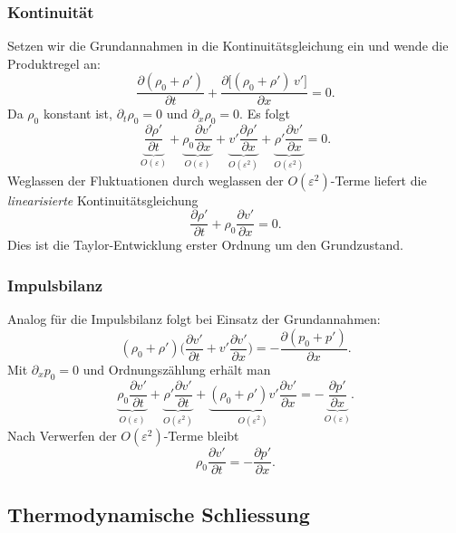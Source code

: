 \subsubsection{Kontinuität}
Setzen wir die Grundannahmen in die Kontinuitätsgleichung ein und
%
wende die Produktregel an:
\[
    \frac{\partial(\rho_0+\rho')}{\partial t}
    +\frac{\partial\big[(\rho_0+\rho')\,v'\big]}{\partial x}=0.
\]
Da \(\rho_0\) konstant ist, \(\partial_t\rho_0=0\) und \(\partial_x\rho_0=0\).
Es folgt
\[
    \underbrace{\frac{\partial \rho'}{\partial t}}_{\displaystyle O(\varepsilon)}
    +\underbrace{\rho_0\frac{\partial v'}{\partial x}}_{\displaystyle O(\varepsilon)}
    +\underbrace{v'\frac{\partial \rho'}{\partial x}}_{\displaystyle O(\varepsilon^2)}
    +\underbrace{\rho'\frac{\partial v'}{\partial x}}_{\displaystyle O(\varepsilon^2)}=0.
\]
Weglassen der Fluktuationen durch weglassen der \(O(\varepsilon^2)\)-Terme
liefert die \emph{linearisierte} Kontinuitätsgleichung
%
\begin{equation}
    \frac{\partial \rho'}{\partial t}+\rho_0\frac{\partial v'}{\partial x}=0.
    \label{eq:lin-cont}
\end{equation}
Dies ist die Taylor-Entwicklung erster Ordnung um den Grundzustand.

\subsubsection{Impulsbilanz}
Analog für die Impulsbilanz folgt bei Einsatz der Grundannahmen:
\[
    (\rho_0+\rho')\biggl(\frac{\partial v'}{\partial t}+v'\frac{\partial v'}{\partial x}\biggr)
    =-\frac{\partial (p_0+p')}{\partial x}.
\]
Mit \(\partial_x p_0=0\) und Ordnungszählung erhält man
\[
    \underbrace{\rho_0\frac{\partial v'}{\partial t}}_{\displaystyle O(\varepsilon)}
    +\underbrace{\rho'\frac{\partial v'}{\partial t}}_{\displaystyle O(\varepsilon^2)}
    +\underbrace{(\rho_0+\rho')v'\frac{\partial v'}{\partial x}}_{\displaystyle O(\varepsilon^2)}
    =-\underbrace{\frac{\partial p'}{\partial x}}_{\displaystyle O(\varepsilon)}.
\]
Nach Verwerfen der \(O(\varepsilon^2)\)-Terme bleibt
\begin{equation}
    \rho_0\frac{\partial v'}{\partial t}=-\frac{\partial p'}{\partial x}.
    \label{eq:lin-mom}
\end{equation}

\subsection{Thermodynamische Schliessung}

